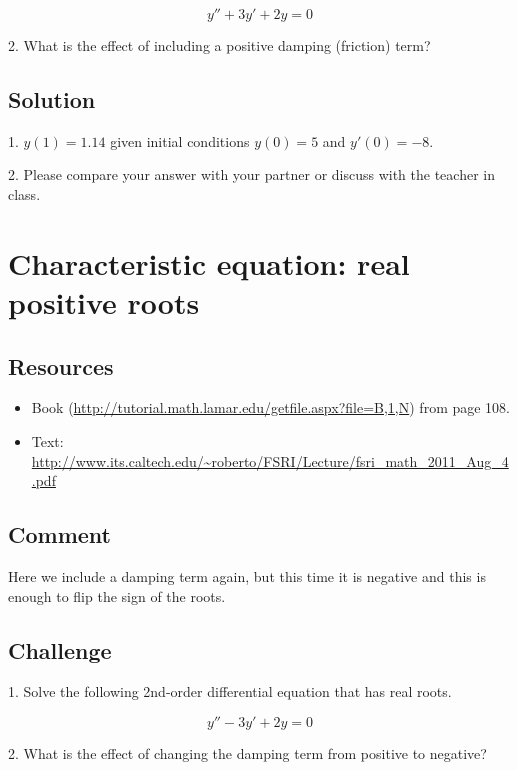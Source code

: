 \begin{equation}
    \label{eq:ccrrpb}
    y'' + 3 y' + 2 y = 0
\end{equation}

2. What is the effect of including a positive damping (friction) term?

\subsection*{Solution}
1. $y(1) = 1.14$ given initial conditions $y(0)=5$ and $y'(0)=-8$.

2. Please compare your answer with your partner or discuss with the teacher in class.




\newpage
\section{Characteristic equation: real positive roots}

\subsection*{Resources}
\begin{itemize}
    \item Book (\url{http://tutorial.math.lamar.edu/getfile.aspx?file=B,1,N}) from page 108.
    \item Text: \url{http://www.its.caltech.edu/~roberto/FSRI/Lecture/fsri_math_2011_Aug_4.pdf}
\end{itemize}

\subsection*{Comment}
Here we include a damping term again, but this time it is negative and this is enough to flip the sign of the roots.

\subsection*{Challenge}
1. Solve the following 2nd-order differential equation that has real roots. 

\begin{equation}
    y'' - 3 y' + 2 y = 0
\end{equation}

2. What is the effect of changing the damping term from positive to negative?

